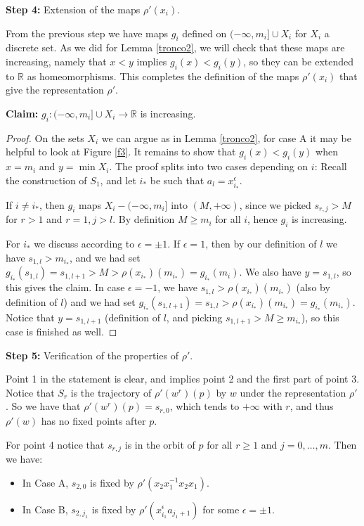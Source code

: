 \documentclass[12pt]{article}
\newcommand{\R}{\mathbb{R}}
\theoremstyle{definition}
\newcommand{\vs}{\vspace{0.3cm}}
\begin{document}
\vs
{\flushleft \bf Step 4:} Extension of the maps $\rho'(x_i)$.
\vs

From the previous step we have maps $g_i$ defined on $(-\infty,m_i]\cup X_i$ for $X_i$ a discrete set. As we did for Lemma \ref{tronco2}, we will check that these maps are increasing, namely that $x<y$ implies $g_i(x)<g_i(y)$, so they can be extended to $\R$ as homeomorphisms. This completes the definition of the maps $\rho'(x_i)$ that give the representation $\rho'$.

\vs
{\bf Claim:} $g_i:(-\infty,m_i]\cup X_i\to\R$ is increasing.
\vs

\begin{proof} On the sets $X_i$ we can argue as in Lemma \ref{tronco2}, for case A it may be helpful to look at Figure \ref{f3}. It remains to show that $g_i(x)<g_i(y)$ when $x=m_i$ and $y=\min X_i$. The proof splits into two cases depending on $i$: Recall the construction of $S_1$, and let $i_*$ be such that $a_l=x_{i_*}^{\epsilon}$. 

If $i\neq i_*$, then $g_i$ maps $X_i-(-\infty,m_i]$ into $(M,+\infty)$, since we picked $s_{r,j}>M$ for $r>1$ and $r=1,j>l$. By definition $M\geq m_i$ for all $i$, hence $g_i$ is increasing. 

For $i_*$ we discuss according to $\epsilon=\pm 1$. If $\epsilon=1$, then by our definition of $l$ we have $s_{1,l}>m_{i_*}$, and we had set $g_{i_*}(s_{1,l})=s_{1,l+1}>M>\rho(x_{i_*})(m_{i_*})=g_{i_*}(m_i)$. We also have $y=s_{1,l}$, so this gives the claim. In case $\epsilon=-1$, we have $s_{1,l}>\rho(x_{i_*})(m_{i_*})$ (also by definition of $l$) and we had set $g_{i_*}(s_{1,l+1})=s_{1,l}>\rho(x_{i_*})(m_{i_*})=g_{i_*}(m_{i_*})$. Notice that $y=s_{1,l+1}$ (definition of $l$, and picking $s_{1,l+1}>M\geq m_{i_*}$), so this case is finished as well. 


\end{proof}

\vs
{\flushleft \bf Step 5:} Verification of the properties of $\rho'$.
\vs

Point 1 in the statement is clear, and implies point 2 and the first part of point 3. Notice that $S_r$ is the trajectory of $\rho'(w^r)(p)$ by $w$ under the representation $\rho'$. So we have that $\rho'(w^r)(p)=s_{r,0}$, which tends to $+\infty$ with $r$, and thus $\rho'(w)$ has no fixed points after $p$.

For point 4 notice that $s_{r,j}$ is in the orbit of $p$ for all $r\geq 1$ and $j=0,\ldots,m$. Then we have:

\begin{itemize}
\item In Case A, $s_{2,0}$ is fixed by $\rho'(x_2x_1^{-1}x_2x_1)$.
\item In Case B, $s_{2,j_1}$ is fixed by $\rho'(x_{i_1}^{\epsilon}a_{j_1+1})$ for some $\epsilon=\pm 1$.
\end{itemize} 
\end{document}
